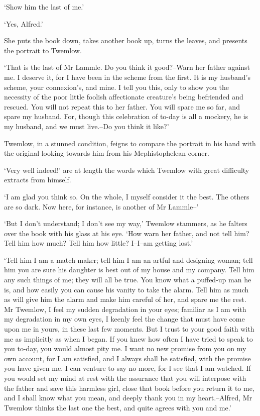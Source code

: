 ‘Show him the last of me.’

‘Yes, Alfred.’

She puts the book down, takes another book up, turns the leaves, and
presents the portrait to Twemlow.

‘That is the last of Mr Lammle. Do you think it good?--Warn her father
against me. I deserve it, for I have been in the scheme from the first.
It is my husband’s scheme, your connexion’s, and mine. I tell you this,
only to show you the necessity of the poor little foolish affectionate
creature’s being befriended and rescued. You will not repeat this to her
father. You will spare me so far, and spare my husband. For, though this
celebration of to-day is all a mockery, he is my husband, and we must
live.--Do you think it like?’

Twemlow, in a stunned condition, feigns to compare the portrait in his
hand with the original looking towards him from his Mephistophelean
corner.

‘Very well indeed!’ are at length the words which Twemlow with great
difficulty extracts from himself.

‘I am glad you think so. On the whole, I myself consider it the best.
The others are so dark. Now here, for instance, is another of Mr
Lammle--’

‘But I don’t understand; I don’t see my way,’ Twemlow stammers, as he
falters over the book with his glass at his eye. ‘How warn her father,
and not tell him? Tell him how much? Tell him how little? I--I--am
getting lost.’

‘Tell him I am a match-maker; tell him I am an artful and designing
woman; tell him you are sure his daughter is best out of my house and my
company. Tell him any such things of me; they will all be true. You know
what a puffed-up man he is, and how easily you can cause his vanity to
take the alarm. Tell him as much as will give him the alarm and make
him careful of her, and spare me the rest. Mr Twemlow, I feel my sudden
degradation in your eyes; familiar as I am with my degradation in my own
eyes, I keenly feel the change that must have come upon me in yours,
in these last few moments. But I trust to your good faith with me as
implicitly as when I began. If you knew how often I have tried to speak
to you to-day, you would almost pity me. I want no new promise from you
on my own account, for I am satisfied, and I always shall be satisfied,
with the promise you have given me. I can venture to say no more, for
I see that I am watched. If you would set my mind at rest with the
assurance that you will interpose with the father and save this harmless
girl, close that book before you return it to me, and I shall know what
you mean, and deeply thank you in my heart.--Alfred, Mr Twemlow thinks
the last one the best, and quite agrees with you and me.’

